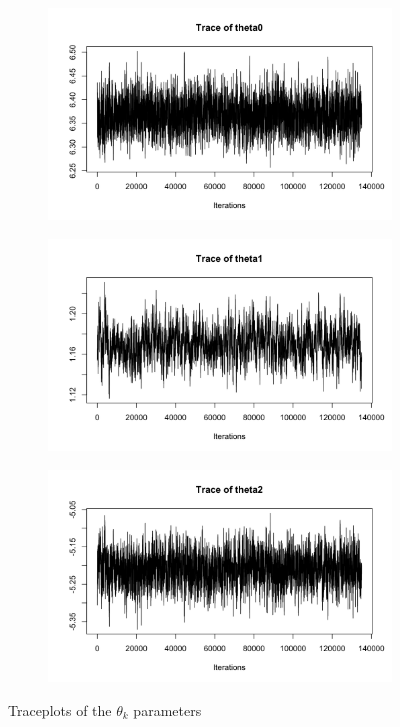 \begin{figure}[H]
	\centering
	\begin{subfigure}{0.3\textwidth}
		\centering
		\includegraphics{figures/metropolis_vw_traceplot_theta0}
	\end{subfigure}
	\begin{subfigure}{0.3\textwidth}
		\centering
		\includegraphics{figures/metropolis_vw_traceplot_theta1}
	\end{subfigure}
	\begin{subfigure}{0.3\textwidth}
		\centering
		\includegraphics{figures/metropolis_vw_traceplot_theta2}
	\end{subfigure}
	\caption{Traceplots of the $\theta_k$ parameters}
	\label{fig:metropolis-vw-traceplots}
\end{figure}

